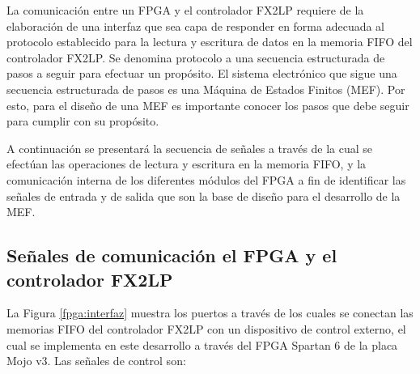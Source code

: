 La comunicación entre un FPGA y el controlador FX2LP requiere de la elaboración de una interfaz que sea capa de responder en forma adecuada al protocolo establecido para la lectura y escritura de datos en la memoria FIFO del controlador FX2LP. Se denomina protocolo a una secuencia estructurada de pasos a seguir para efectuar un propósito. El sistema electrónico que sigue una secuencia estructurada de pasos es una Máquina de Estados Finitos (MEF). Por esto, para el diseño de una MEF es importante conocer los pasos que debe seguir para cumplir con su propósito.

A continuación se presentará la secuencia de señales a través de la cual se efectúan las operaciones de lectura y escritura en la memoria FIFO, y la comunicación interna de los diferentes módulos del FPGA a fin de identificar las señales de entrada y de salida que son la base de diseño para el desarrollo de la MEF.




\subsection{Señales de comunicación el FPGA y el controlador FX2LP}

	La Figura \ref{fpga:interfaz} muestra los puertos a través de los cuales se conectan las memorias FIFO del controlador FX2LP con un dispositivo de control externo, el cual se implementa en este desarrollo a través del FPGA Spartan 6 de la placa Mojo v3. Las señales de control son:
		
